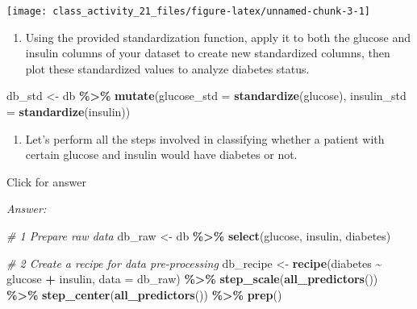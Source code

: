 \documentclass[
]{book}
\newenvironment{Shaded}{\begin{snugshade}}{\end{snugshade}}
\newcommand{\AttributeTok}[1]{\textcolor[rgb]{0.13,0.29,0.53}{#1}}
\newcommand{\CommentTok}[1]{\textcolor[rgb]{0.56,0.35,0.01}{\textit{#1}}}
\newcommand{\FunctionTok}[1]{\textcolor[rgb]{0.13,0.29,0.53}{\textbf{#1}}}
\newcommand{\NormalTok}[1]{#1}
\newcommand{\OtherTok}[1]{\textcolor[rgb]{0.56,0.35,0.01}{#1}}
\newcommand{\SpecialCharTok}[1]{\textcolor[rgb]{0.81,0.36,0.00}{\textbf{#1}}}
\providecommand{\tightlist}{%
  \setlength{\itemsep}{0pt}\setlength{\parskip}{0pt}}
\begin{document}
\texttt{[image: class\_activity\_21\_files/figure-latex/unnamed-chunk-3-1]}

\begin{enumerate}
\def\labelenumi{\alph{enumi}.}
\setcounter{enumi}{1}
\tightlist
\item
  Using the provided standardization function, apply it to both the glucose and insulin columns of your dataset to create new standardized columns, then plot these standardized values to analyze diabetes status.
\end{enumerate}

\begin{Shaded}
\begin{Highlighting}[]
\NormalTok{db\_std }\OtherTok{\textless{}{-}}\NormalTok{ db }\SpecialCharTok{\%\textgreater{}\%}
  \FunctionTok{mutate}\NormalTok{(}\AttributeTok{glucose\_std =} \FunctionTok{standardize}\NormalTok{(glucose),}
         \AttributeTok{insulin\_std =} \FunctionTok{standardize}\NormalTok{(insulin))}
\end{Highlighting}
\end{Shaded}

\begin{enumerate}
\def\labelenumi{\alph{enumi}.}
\setcounter{enumi}{2}
\tightlist
\item
  Let's perform all the steps involved in classifying whether a patient with certain glucose and insulin would have diabetes or not.
\end{enumerate}

Click for answer

\emph{Answer:}

\begin{Shaded}
\begin{Highlighting}[]
\CommentTok{\# 1 Prepare raw data}
\NormalTok{db\_raw }\OtherTok{\textless{}{-}}\NormalTok{ db  }\SpecialCharTok{\%\textgreater{}\%}  \FunctionTok{select}\NormalTok{(glucose, insulin, diabetes)}
\end{Highlighting}
\end{Shaded}

\begin{Shaded}
\begin{Highlighting}[]
\CommentTok{\# 2 Create a recipe for data pre{-}processing}
\NormalTok{db\_recipe }\OtherTok{\textless{}{-}} \FunctionTok{recipe}\NormalTok{(diabetes }\SpecialCharTok{\textasciitilde{}}\NormalTok{ glucose }\SpecialCharTok{+}\NormalTok{ insulin, }\AttributeTok{data =}\NormalTok{ db\_raw) }\SpecialCharTok{\%\textgreater{}\%}
  \FunctionTok{step\_scale}\NormalTok{(}\FunctionTok{all\_predictors}\NormalTok{()) }\SpecialCharTok{\%\textgreater{}\%}
  \FunctionTok{step\_center}\NormalTok{(}\FunctionTok{all\_predictors}\NormalTok{()) }\SpecialCharTok{\%\textgreater{}\%}
  \FunctionTok{prep}\NormalTok{()}
\end{Highlighting}
\end{Shaded}
\end{document}
